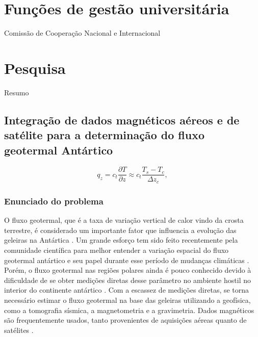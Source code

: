 \documentclass[11pt,a4paper,oneside]{book}
\begin{document}
\chapter{Funções de gestão universitária}

Comissão de Cooperação Nacional e Internacional

\chapter{Pesquisa}

Resumo


\section{Integração de dados magnéticos aéreos e de satélite para a determinação do fluxo geotermal Antártico}

\begin{equation}
  q_z = c_t \dfrac{\partial T}{\partial z} \approx c_t \dfrac{T_s - T_c}{\Delta z_c},
\end{equation}

\subsection{Enunciado do problema}

O fluxo geotermal, que é a taxa de variação vertical de calor vindo da
crosta terrestre, é considerado um importante fator que influencia a evolução
das geleiras na Antártica \citep{Seroussi2017}.
Um grande esforço tem sido feito recentemente pela comunidade científica para
melhor entender a variação espacial do fluxo geotermal antártico e seu papel
durante esse período de mudanças climáticas \citep{BurtonJohnson2020}.
Porém, o fluxo geotermal nas regiões polares ainda é pouco conhecido devido à
dificuldade de se obter medições diretas desse parâmetro no ambiente hostil no
interior do continente antártico \citep{BurtonJohnson2020}.
Com a escassez de medições diretas, se torna necessário estimar o fluxo
geotermal na base das geleiras utilizando a geofísica, como a tomografia
sísmica, a magnetometria e a gravimetria.
Dados magnéticos são frequentemente usados, tanto provenientes de aquisições
aéreas \citep[e.g.,][]{Lowe2023} quanto de satélites
\citep[e.g.,][]{FoxMaule2005}.
\end{document}

